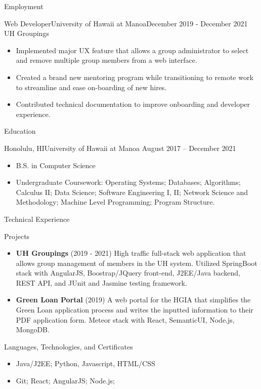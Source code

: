 \documentclass[]{mcdowellcv}
\begin{document}
	\makeheader
	
	\begin{cvsection}{Employment}
		\begin{cvsubsection}{Web Developer}{University of Hawaii at Manoa}{December 2019 - December 2021}
			UH Groupings
			\begin{itemize}
				\item Implemented major UX feature that allows a group administrator to select and remove multiple group members from a web interface.
				\item Created a brand new mentoring program while transitioning to remote work to streamline and ease on-boarding of new hires.
				\item Contributed technical documentation to improve onboarding and developer experience.
			\end{itemize}
		\end{cvsubsection}
		
	\end{cvsection}
	
	\begin{cvsection}{Education}
		\begin{cvsubsection}{Honolulu, HI}{University of Hawaii at Manoa }{August 2017 -- December 2021}
			\begin{itemize}
				\item B.S. in Computer Science
				\item Undergraduate Coursework: Operating Systems; Databases; Algorithms; Calculus II; Data Science; Software Engineering I, II; Network Science and Methodology; Machine Level Programming; Program Structure.
			\end{itemize}
		\end{cvsubsection}
	\end{cvsection}
	
	\begin{cvsection}{Technical Experience}
		\begin{cvsubsection}{Projects}{}{}
			\begin{itemize}
				\item \textbf{UH Groupings} (2019 - 2021) High traffic full-stack web application that allows group management of members in the UH system. Utilized SpringBoot stack with AngularJS, Boostrap/JQuery front-end, J2EE/Java backend, REST API, and JUnit and Jasmine testing framework.
				\item \textbf{Green Loan Portal} (2019) A web portal for the HGIA that simplifies the Green Loan application process and writes the inputted information to their PDF application form. Meteor stack with React, SemanticUI, Node.js, MongoDB.
			\end{itemize}
		\end{cvsubsection}
	\end{cvsection}
	
	\begin{cvsection}{Languages, Technologies, and Certificates}
		\begin{cvsubsection}{}{}{}	
			\begin{itemize}
				\item Java/J2EE; Python, Javascript, HTML/CSS
				\item Git; React; AngularJS; Node.js;
			\end{itemize}
		\end{cvsubsection}
	\end{cvsection}
	
\end{document}

